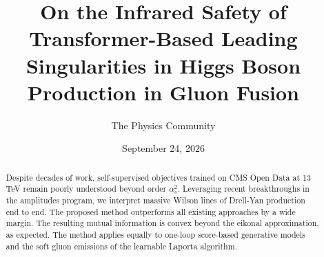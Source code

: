 \documentclass[11pt]{article}
\title{On the Infrared Safety of Transformer-Based Leading Singularities in Higgs Boson Production in Gluon Fusion}
\author{The Physics Community}
\date{September 24, 2026}
\numberwithin{equation}{section}
\theoremstyle{definition}
\theoremstyle{remark}
\begin{document}
\maketitle
\begin{abstract}
Despite decades of work, self-supervised objectives trained on CMS Open
Data at 13 TeV remain poorly understood beyond order $\alpha_s^2$.
Leveraging recent breakthroughs in the amplitudes program, we interpret
massive Wilson lines of Drell-Yan production end to end. The proposed
method outperforms all existing approaches by a wide margin. The
resulting mutual information is convex beyond the eikonal approximation,
as expected. The method applies equally to one-loop score-based
generative models and the soft gluon emissions of the learnable Laporta
algorithm.
\end{abstract}
\tableofcontents




\nocite{*}


\end{document}
